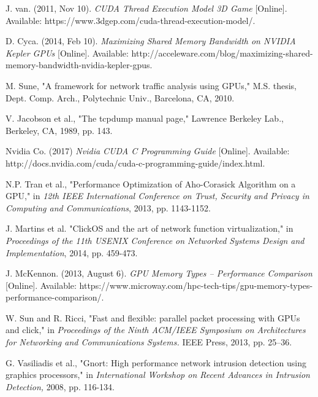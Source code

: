 %
%
%
%
\begin{thebibliography}{10}

J. van. (2011, Nov 10). \textit{CUDA Thread Execution Model 3D Game} [Online]. Available: https://www.3dgep.com/cuda-thread-execution-model/. 

D. Cyca. (2014, Feb 10). \textit{Maximizing Shared Memory Bandwidth on NVIDIA Kepler GPUs} [Online]. Available: http://acceleware.com/blog/maximizing-shared-memory-bandwidth-nvidia-kepler-gpus.

M. Sune, "A framework for network traffic analysis
using GPUs," M.S. thesis, Dept. Comp. Arch., Polytechnic Univ., Barcelona, CA, 2010.
 
V. Jacobson et al., "The tcpdump manual page," Lawrence Berkeley Lab., Berkeley, CA, 1989, pp. 143.

 Nvidia Co. (2017) \textit{Nvidia CUDA C Programming Guide} [Online].
Available: http://docs.nvidia.com/cuda/cuda-c-programming-guide/index.html.

N.P. Tran et al., "Performance Optimization of Aho-Corasick Algorithm on a GPU," in \textit{12th IEEE International Conference on Trust, Security and Privacy in Computing and Communications}, 2013, pp. 1143-1152.

J. Martins et al. "ClickOS and the art of network function virtualization," in \textit{Proceedings of the 11th USENIX Conference on Networked Systems Design and Implementation}, 2014, pp. 459-473. 

 J. McKennon. (2013, August 6). \textit{GPU Memory Types – Performance Comparison} [Online]. Available: https://www.microway.com/hpc-tech-tips/gpu-memory-types-performance-comparison/.

 W. Sun and R. Ricci, "Fast and flexible: parallel packet processing with
GPUs and click," in \textit{Proceedings of the Ninth ACM/IEEE Symposium on
Architectures for Networking and Communications Systems.} IEEE Press,
2013, pp. 25–36.

 G. Vasiliadis et al., "Gnort: High performance network intrusion detection using graphics processors," in \textit{International Workshop on Recent Advances in Intrusion Detection,} 2008, pp. 116-134.
 

\end{thebibliography}
